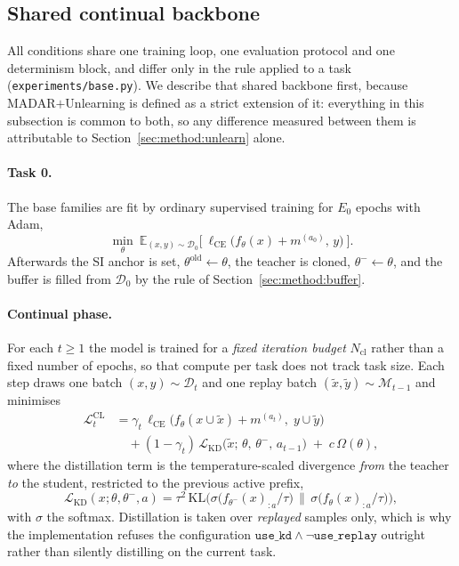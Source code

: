 \subsection{Shared continual backbone}
\label{sec:method:madar}

All conditions share one training loop, one evaluation protocol and one
determinism block, and differ only in the rule applied to a task
(\texttt{experiments/base.py}). We describe that shared backbone first, because
MADAR${+}$Unlearning is defined as a strict extension of it: everything in this
subsection is common to both, so any difference measured between them is
attributable to Section~\ref{sec:method:unlearn} alone.

\paragraph{Task 0.}
The base families are fit by ordinary supervised training for $E_0$ epochs with
Adam,
\begin{equation}
  \label{eq:task0}
  \min_\theta\ \mathbb{E}_{(x,y)\sim\mathcal{D}_0}
    \big[\ \ell_{\mathrm{CE}}\!\big(f_\theta(x) + m^{(a_0)},\, y\big)\ \big].
\end{equation}
Afterwards the SI anchor is set, $\theta^{\text{old}} \leftarrow \theta$, the
teacher is cloned, $\theta^{-} \leftarrow \theta$, and the buffer is filled from
$\mathcal{D}_0$ by the rule of Section~\ref{sec:method:buffer}.

\paragraph{Continual phase.}
For each $t \ge 1$ the model is trained for a \emph{fixed iteration budget}
$N_{\mathrm{cl}}$ rather than a fixed number of epochs, so that compute per task
does not track task size. Each step draws one batch $(x,y) \sim \mathcal{D}_t$
and one replay batch $(\tilde{x},\tilde{y}) \sim \mathcal{M}_{t-1}$ and minimises
\begin{align}
  \label{eq:cl}
  \mathcal{L}^{\mathrm{CL}}_t
   &= \gamma_t\,
      \ell_{\mathrm{CE}}\!\big(f_\theta(x \cup \tilde{x}) + m^{(a_t)},\;
                                y \cup \tilde{y}\big) \nonumber\\
   &\quad + (1-\gamma_t)\,
      \mathcal{L}_{\mathrm{KD}}\!\big(\tilde{x};\, \theta,\, \theta^{-},\, a_{t-1}\big)
      \;+\; c\,\Omega(\theta),
\end{align}
where the distillation term is the temperature-scaled divergence \emph{from} the
teacher \emph{to} the student, restricted to the previous active prefix,
\begin{equation}
  \label{eq:kd}
  \mathcal{L}_{\mathrm{KD}}(x;\theta,\theta^{-},a)
   = \tau^{2}\,
     \mathrm{KL}\!\Big(
       \sigma\big(f_{\theta^{-}}(x)_{:a}/\tau\big)
       \,\Big\|\,
       \sigma\big(f_{\theta}(x)_{:a}/\tau\big)
     \Big),
\end{equation}
with $\sigma$ the softmax. Distillation is taken over \emph{replayed} samples
only, which is why the implementation refuses the configuration
$\texttt{use\_kd}\wedge\neg\texttt{use\_replay}$ outright rather than silently
distilling on the current task.

